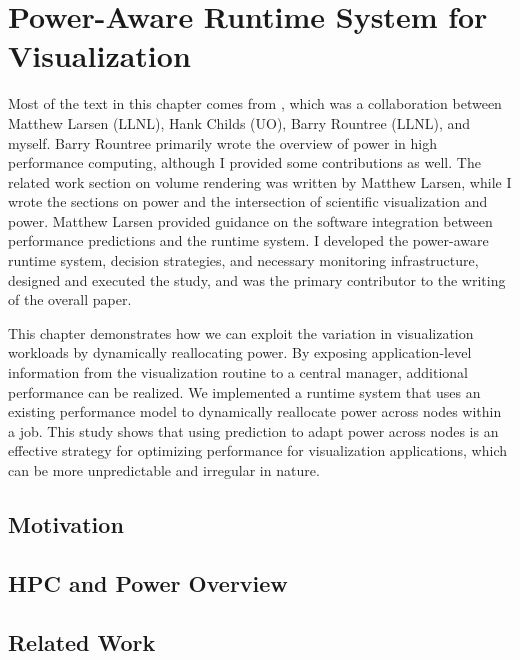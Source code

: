 \chapter{Power-Aware Runtime System for Visualization}
\label{ch:egpgv}

Most of the text in this chapter comes from \cite{pgv.20171088}, which was a
collaboration between Matthew Larsen (LLNL), Hank Childs (UO), Barry Rountree
(LLNL), and myself.
%
Barry Rountree primarily wrote the overview of power in high performance
computing, although I provided some contributions as well.
%
The related work section on volume rendering was written by Matthew Larsen,
while I wrote the sections on power and the intersection of scientific
visualization and power.
%
Matthew Larsen provided guidance on the software integration between
performance predictions and the runtime system.
%
I developed the power-aware runtime system, decision strategies, and
necessary monitoring infrastructure, designed and executed the study, and was
the primary contributor to the writing of the overall paper.

This chapter demonstrates how we can exploit the variation in visualization
workloads by dynamically reallocating power.
%
By exposing application-level information from the visualization routine to a
central manager, additional performance can be realized.
%
We implemented a runtime system that uses an existing performance model to
dynamically reallocate power across nodes within a job.
%
This study shows that using prediction to adapt power across nodes is an
effective strategy for optimizing performance for visualization applications,
which can be more unpredictable and irregular in nature.

\section{Motivation}


\section{HPC and Power Overview}
\label{sec:ch4-powhpc}


\section{Related Work}
\label{sec:ch4-relwork}


